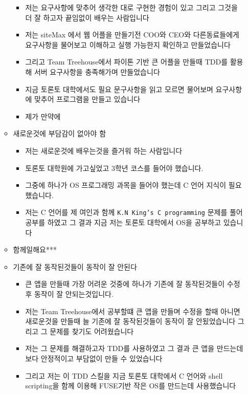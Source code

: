 \documentclass[12pt]{article}
\begin{document}
\begin{itemize}
\begin{itemize}
        \begin{itemize}
            \item 저는 요구사항에 맞추어 생각한 대로 구현한 경험이 있고 그리고 그것을 더 잘 하고자 끝임없이 배우는 사람입니다
            \item 저는 siteMax 에서 웹 어플을 만들기전 COO와 CEO와 다른동료들에게 요구사항을 물어보고 이해하고 실행 가능한지 확인하고 만들었습니다
            \item 그리고 Team Treehouse에서 파이톤 기반 큰 어플을 만들때 TDD를 활용해 서버 요구사항을 충족해가며 만들었습니다
            \item 지금 토론토 대학에서도 필요 문구사항을 읽고 모르면 물어보며 요구사항에 맞추어 프로그램을 만들고 있습니다
            \item 제가 만약에
        \end{itemize}
        \item 새로운것에 부담감이 없아야 함
        \begin{itemize}
            \item 저는 새로운것에 배우는것을 즐거워 하는 사람입니다
            \item 토론토 대학원에 가고싶었고 3학년 코스를 들어야 했습니다.
            \item 그중에 하나가 OS 프로그래밍 과목을 들어야 했는데 C 언어 지식이 필요했습니다.
            \item 저는 C 언어를 제 여인과 함께 \texttt{K.N King's C programming} 문제를 풀어 공부를 하였고 그 결과 지금 저는 토론토 대학에서 OS을 공부하고 있습니다
        \end{itemize}
        \item 함께일해요***

        \item 기존에 잘 동작된것들이 동작이 잘 안된다

        \begin{itemize}
            \item 큰 앱을 만들때 가장 어려운 것중에 하나가 기존에 잘 동작된것들이 수정 후 동작이 잘 안되는것입니다.
            \item 저는 Team Treehouse에서 공부할떄 큰 앱을 만들며 수정을 할때 아니면 새로운것을 만들때 늘 기존에 잘 동작된것들이 동작이 잘 안됬었습니다 그리고 그 문제를 찾기도 어려웠습니다
            \item 저는 그 문제를 해결하고자 TDD를 사용하였고 그 결과 큰 앱을 만드는데 보다 안정적이고 부담없이 만들 수 있었습니다
            \item 그리고 저는 이 TDD 스킬을 지금 토론토 대학에서 C 언어와 shell scripting을 함께 이용해 FUSE기반 작은 OS를 만드는데 사용했습니다
        \end{itemize}


\end{itemize}
\end{itemize}
\end{document}
